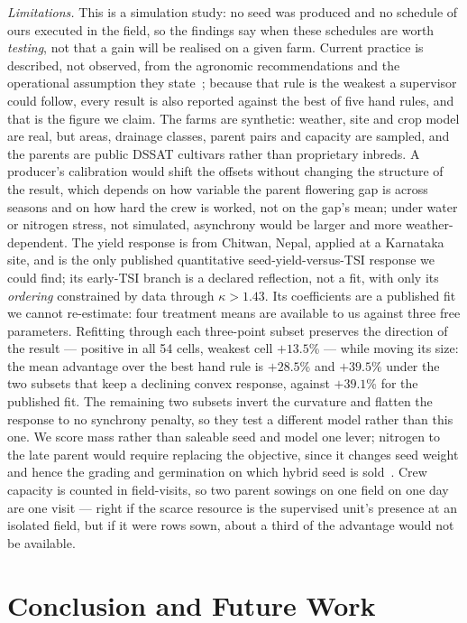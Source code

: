 \documentclass[10pt,twocolumn]{article}
\begin{document}
\emph{Limitations.} This is a simulation study: no seed was produced and no
schedule of ours executed in the field, so the findings say when these
schedules are worth \emph{testing}, not that a gain will be realised on a
given farm. Current practice is described, not observed, from the agronomic
recommendations and the operational assumption they
state~\cite{chassaigne2021}; because that rule is the weakest a supervisor
could follow, every result is also reported against the best of five hand
rules, and that is the figure we claim. The farms are synthetic: weather,
site and crop model are real, but areas, drainage classes, parent pairs and
capacity are sampled, and the parents are public DSSAT cultivars rather than
proprietary inbreds. A producer's calibration would shift the offsets
without changing the structure of the result, which depends on how variable
the parent flowering gap is across seasons and on how hard the crew is
worked, not on the gap's mean; under water or nitrogen stress, not
simulated, asynchrony would be larger and more weather-dependent. The yield
response is from Chitwan, Nepal, applied at a Karnataka site, and is the
only published quantitative seed-yield-versus-TSI response we could find;
its early-TSI branch is a declared reflection, not a fit, with only its
\emph{ordering} constrained by data through $\kappa > 1.43$. Its coefficients
are a published fit we cannot re-estimate: four treatment means are available
to us against three free parameters. Refitting through each three-point
subset preserves the direction of the result --- positive in all 54 cells,
weakest cell $+13.5$\% --- while moving its size: the mean advantage over the
best hand rule is $+28.5$\% and $+39.5$\% under the two subsets that keep a
declining convex response, against $+39.1$\% for the published fit. The
remaining two subsets invert the curvature and flatten the response to no
synchrony penalty, so they test a different model rather than this one. We score mass
rather than saleable seed and model one lever; nitrogen to the late parent
would require replacing the objective, since it changes seed weight and
hence the grading and germination on which hybrid seed is
sold~\cite{marahatta2025,priyanka2017,patil2026}. Crew capacity is counted
in field-visits, so two parent sowings on one field on one day are one visit
--- right if the scarce resource is the supervised unit's presence at an
isolated field, but if it were rows sown, about a third of the advantage
would not be available.

\section{Conclusion and Future Work}
\end{document}
